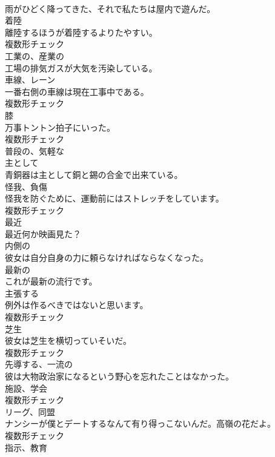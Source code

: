 \documentclass[8pt]{extreport}
\begin{document}
\begin{CJK}{UTF8}{min}
\\	雨がひどく降ってきた、それで私たちは屋内で遊んだ。	
\\	[名詞]	着陸	
\\	離陸するほうが着陸するよりたやすい。	
\\	複数形チェック
\\	[形容詞]	工業の、産業の	
\\	工場の排気ガスが大気を汚染している。	
\\	[名詞]	車線、レーン	
\\	一番右側の車線は現在工事中である。	
\\	複数形チェック
\\	[名詞]	膝	
\\	万事トントン拍子にいった。	
\\	複数形チェック
\\	[形容詞]	普段の、気軽な	
\\	[副詞]	主として	
\\	青銅器は主として銅と錫の合金で出来ている。	
\\	[名詞]	怪我、負傷	
\\	怪我を防ぐために、運動前にはストレッチをしています。	
\\	複数形チェック
\\	[副詞]	最近	
\\	最近何か映画見た？	
\\	[形容詞]	内側の	
\\	彼女は自分自身の力に頼らなければならなくなった。	
\\	[形容詞]	最新の	
\\	これが最新の流行です。	
\\	[名詞]	主張する	
\\	例外は作るべきではないと思います。	
\\	複数形チェック
\\	[名詞]	芝生	
\\	彼女は芝生を横切っていそいだ。	
\\	複数形チェック
\\	[形容詞]	先導する、一流の	
\\	彼は大物政治家になるという野心を忘れたことはなかった。	
\\	[名詞]	施設、学会	
\\	複数形チェック
\\	[名詞]	リーグ、同盟	
\\	ナンシーが僕とデートするなんて有り得っこないんだ。高嶺の花だよ。	
\\	複数形チェック
\\	[名詞]	指示、教育	

\end{CJK}
\end{document}
